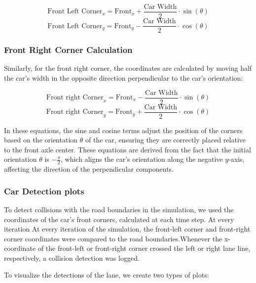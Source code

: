 \documentclass[12pt]{article}
\begin{document}
\[
\text{Front Left Corner}_x = \text{Front}_x + \frac{\text{Car Width}}{2} \cdot \sin(\theta)
\]
\[
\text{Front Left Corner}_y = \text{Front}_y - \frac{\text{Car Width}}{2} \cdot \cos(\theta)
\]

\subsubsection*{Front Right Corner Calculation}

Similarly, for the front right corner, the coordinates are calculated by moving half the car's width in the opposite direction perpendicular to the car's orientation:

\[
\text{Front right Corner}_x = \text{Front}_x - \frac{\text{Car Width}}{2} \cdot \sin(\theta)
\]
\[
\text{Front right Corner}_y = \text{Front}_y + \frac{\text{Car Width}}{2} \cdot \cos(\theta)
\]

In these equations, the sine and cosine terms adjust the position of the corners based on the orientation \(\theta\) of the car, ensuring they are correctly placed relative to the front axle center. These equations are derived from the fact that the initial orientation \(\theta\) is \(-\frac{\pi}{2}\), which aligns the car’s orientation along the negative \(y\)-axis, affecting the direction of the perpendicular components.






\subsubsection{Car Detection plots}

To detect collisions with the road boundaries in the simulation, we used the coordinates of the car's front corners, calculated at each time step. At every iteration At every iteration of the simulation, the front-left corner and front-right corner coordinates were compared to the road boundaries.Whenever the x-coordinate of the front-left or front-right corner crossed the left or right lane line, respectively, a collision detection was logged.

To visualize the detections of the lane, we create two types of plots:
\end{document}
